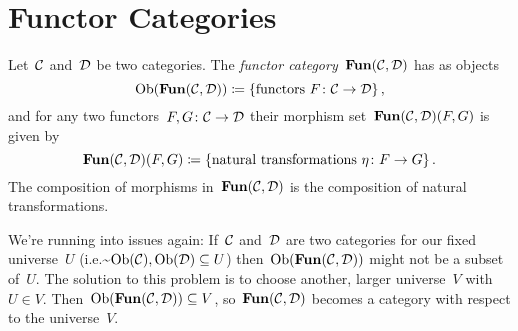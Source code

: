 \section{Functor Categories}


\begin{definition}
  Let~$\mathcal{C}$ and~$\mathcal{D}$ be two categories.
  The \emph{functor category}~$\mathbf{Fun}(\mathcal{C}, \mathcal{D})$ has as objects
  \[
              \operatorname{Ob}(\mathbf{Fun}(\mathcal{C}, \mathcal{D}))
    \coloneqq  \{
                \text{functors~$F \colon \mathcal{C} \to \mathcal{D}$}
              \} \,,
  \]
  and for any two functors~$F, G \colon \mathcal{C} \to \mathcal{D}$ their morphism set~$\mathbf{Fun}(\mathcal{C}, \mathcal{D})(F,G)$ is given by
  \[
              \mathbf{Fun}(\mathcal{C}, \mathcal{D})(F,G)
    \coloneqq  \{
                \text{natural transformations~$\eta \colon F \to G$}
              \} \,.
  \]
  The composition of morphisms in~$\mathbf{Fun}(\mathcal{C}, \mathcal{D})$ is the composition of natural transformations.
\end{definition}


\begin{remark}
  We’re running into  issues again:
  If~$\mathcal{C}$ and~$\mathcal{D}$ are two categories for our fixed universe~$U$ (i.e.\~$\operatorname{Ob}(\mathcal{C}), \operatorname{Ob}(\mathcal{D}) \subseteq U$) then~$\operatorname{Ob}(\mathbf{Fun}(\mathcal{C}, \mathcal{D}))$ might not be a subset of~$U$.
  The solution to this problem is to choose another, larger universe~$V$ with~$U \in V$.
  Then~$\operatorname{Ob}(\mathbf{Fun}(\mathcal{C}, \mathcal{D})) \subseteq V$, so~$\mathbf{Fun}(\mathcal{C}, \mathcal{D})$ becomes a category with respect to the universe~$V$.
\end{remark}


